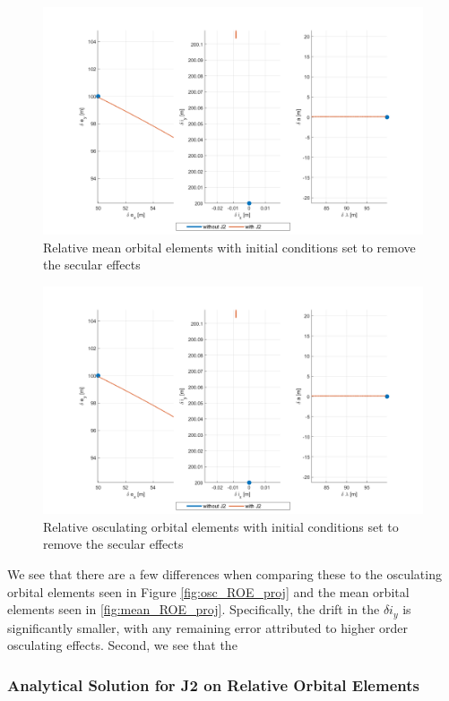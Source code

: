\begin{figure}[htpb]
    \centering
    \includegraphics[width=0.8\linewidth]{sim/figures/PS4/ROE_projections_mean_no_drift_SV2.png}
    \caption{Relative mean orbital elements with initial conditions set to remove the secular effects}
    \label{fig:rel_roe_no_drift_mean}
\end{figure}

\begin{figure}[htpb]
    \centering
    \includegraphics[width=0.8\linewidth]{sim/figures/PS4/ROE_projections_mean_no_drift_SV2.png}
    \caption{Relative osculating orbital elements with initial conditions set to remove the secular effects}
    \label{fig:rel_roe_no_drift_osc}
\end{figure}

We see that there are a few differences when comparing these to the osculating orbital elements seen in Figure \ref{fig:osc_ROE_proj} and the mean orbital elements seen in \ref{fig:mean_ROE_proj}. Specifically, the drift in the $\delta i_y$ is significantly smaller, with any remaining error attributed to higher order osculating effects. Second, we see that the 

\subsubsection{Analytical Solution for J2 on Relative Orbital Elements} \label{sec:j2_analytical_roe}


